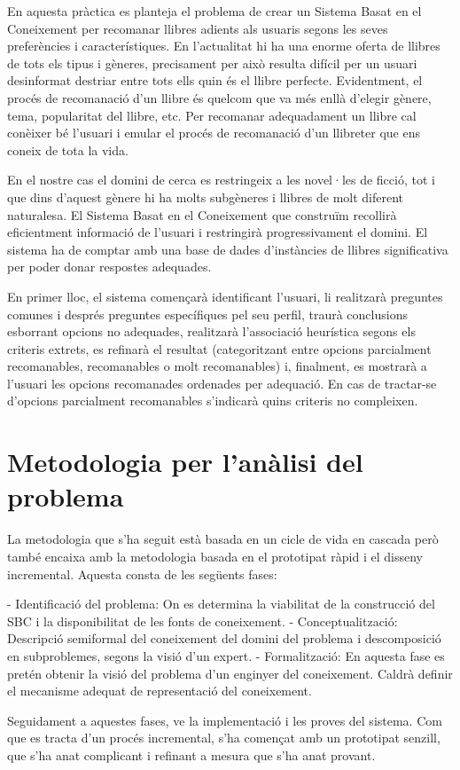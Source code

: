 
En aquesta pràctica es planteja el problema de crear un Sistema Basat en el Coneixement per recomanar llibres adients als usuaris segons les seves preferències i característiques. En l'actualitat hi ha una enorme oferta de llibres de tots els tipus i gèneres, precisament per això resulta difícil per un usuari desinformat destriar entre tots ells quin és el llibre perfecte. Evidentment, el procés de recomanació d'un llibre és quelcom que va més enllà d'elegir gènere, tema, popularitat del llibre, etc. Per recomanar adequadament un llibre cal conèixer bé l'usuari i emular el procés de recomanació d'un llibreter que ens coneix de tota la vida.

En el nostre cas el domini de cerca es restringeix a les novel·les de ficció, tot i que dins d'aquest gènere hi ha molts subgèneres i llibres de molt diferent naturalesa. El Sistema Basat en el Coneixement que construïm recollirà eficientment informació de l'usuari i restringirà progressivament el domini. El sistema ha de comptar amb una base de dades d'instàncies de llibres significativa per poder donar respostes adequades.

En primer lloc, el sistema començarà identificant l'usuari, li realitzarà preguntes comunes i després preguntes específiques pel seu perfil, traurà conclusions esborrant opcions no adequades, realitzarà l'associació heurística segons els criteris extrets, es refinarà el resultat (categoritzant entre opcions parcialment recomanables, recomanables o molt recomanables) i, finalment, es mostrarà a l'usuari les opcions recomanades ordenades per adequació. En cas de tractar-se d'opcions parcialment recomanables s'indicarà quins criteris no compleixen.

\section{Metodologia per l'anàlisi del problema}

La metodologia que s'ha seguit està basada en un cicle de vida en cascada però també encaixa amb la metodologia basada en el prototipat ràpid i el disseny incremental. Aquesta consta de les següents fases:

- Identificació del problema: On es determina la viabilitat de la construcció del SBC i la disponibilitat de les fonts de coneixement.
- Conceptualització: Descripció semiformal del coneixement del domini del problema i descomposició en subproblemes, segons la visió d'un expert.
- Formalització: En aquesta fase es pretén obtenir la visió del problema d'un enginyer del coneixement. Caldrà definir el mecanisme adequat de representació del coneixement.

Seguidament a aquestes fases, ve la implementació i les proves del sistema. Com que es tracta d'un procés incremental, s'ha començat amb un prototipat senzill, que s'ha anat complicant i refinant a mesura que s'ha anat provant.